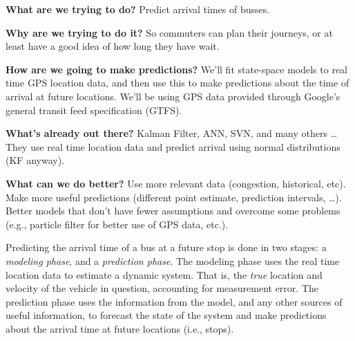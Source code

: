 \documentclass[12pt,a4paper]{article}
\begin{document}









\textbf{What are we trying to do? }
Predict arrival times of busses.

\textbf{Why are we trying to do it?}
So commuters can plan their journeys, or at least have a good idea of how long they have wait.

\textbf{How are we going to make predictions?}
We'll fit state-space models to real time GPS location data,
and then use this to make predictions about the time of arrival at future locations.
We'll be using GPS data provided through Google's general transit feed specification (GTFS).


\textbf{What's already out there?}
Kalman Filter, ANN, SVN, and many others \ldots
They use real time location data and predict arrival using normal distributions (KF anyway).

\textbf{What can we do better?}
Use more relevant data (congestion, historical, etc).
Make more useful predictions (different point estimate, prediction intervals, \ldots).
Better models that don't have fewer assumptions and overcome some problems 
(e.g., particle filter for better use of GPS data, etc.).


Predicting the arrival time of a bus at a future stop is done in two stages:
a \emph{modeling phase}, and a \emph{prediction phase}.
The modeling phase uses the real time location data to estimate a dynamic system.
That is, the \emph{true} location and velocity of the vehicle in question,
accounting for measurement error.
The prediction phase uses the information from the model, and any other sources of useful information,
to forecast the state of the system and make predictions about the arrival time at future locations (i.e., stops).
\end{document}
